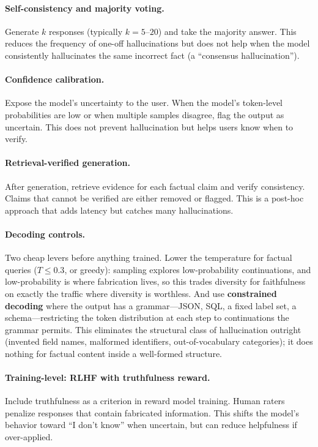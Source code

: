 \paragraph{Self-consistency and majority voting.}
Generate $k$ responses (typically $k = 5$--$20$) and take the majority answer.
This reduces the frequency of one-off hallucinations but does not help when
the model consistently hallucinates the same incorrect fact (a ``consensus
hallucination'').

\paragraph{Confidence calibration.}
Expose the model's uncertainty to the user.  When the model's token-level
probabilities are low or when multiple samples disagree, flag the output as
uncertain.  This does not prevent hallucination but helps users know when to
verify.

\paragraph{Retrieval-verified generation.}
After generation, retrieve evidence for each factual claim and verify
consistency.  Claims that cannot be verified are either removed or flagged.
This is a post-hoc approach that adds latency but catches many hallucinations.

\paragraph{Decoding controls.}
Two cheap levers before anything trained.  Lower the temperature for factual
queries ($T \leq 0.3$, or greedy): sampling explores low-probability
continuations, and low-probability is where fabrication lives, so this trades
diversity for faithfulness on exactly the traffic where diversity is worthless.
And use \textbf{constrained decoding} where the output has a grammar---JSON,
SQL, a fixed label set, a schema---restricting the token distribution at each
step to continuations the grammar permits.  This eliminates the structural class
of hallucination outright (invented field names, malformed identifiers,
out-of-vocabulary categories); it does nothing for factual content inside a
well-formed structure.

\paragraph{Training-level: RLHF with truthfulness reward.}
Include truthfulness as a criterion in reward model training.  Human raters
penalize responses that contain fabricated information.  This shifts the model's
behavior toward ``I don't know'' when uncertain, but can reduce helpfulness if
over-applied.

